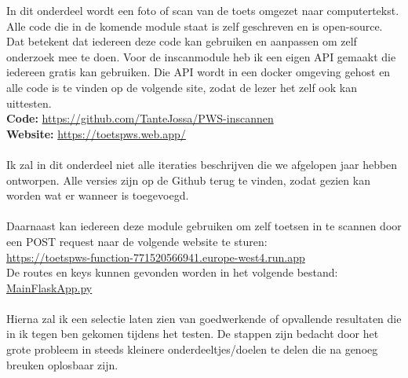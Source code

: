 \documentclass[12pt]{article}
\begin{document}
\begin{multicols}{2}
In dit onderdeel wordt een foto of scan van de toets omgezet naar computertekst. Alle code die in de komende module staat is zelf geschreven en is open-source. Dat betekent dat iedereen deze code kan gebruiken en aanpassen om zelf onderzoek mee te doen. Voor de inscanmodule heb ik een eigen API gemaakt die iedereen gratis kan gebruiken. Die API wordt in een docker omgeving gehost en alle code is te vinden op de volgende site, zodat de lezer het zelf ook kan uittesten. \\
\textbf{Code: }\url{https://github.com/TanteJossa/PWS-inscannen}\\
\textbf{Website: }\url{https://toetspws.web.app/}
\\\\
Ik zal in dit onderdeel niet alle iteraties beschrijven die we afgelopen jaar hebben ontworpen. Alle versies zijn op de Github terug te vinden, zodat gezien kan worden wat er wanneer is toegevoegd. 
\\\\
Daarnaast kan iedereen deze module gebruiken om zelf toetsen in te scannen door een POST request naar de volgende website te sturen: \\
\url{https://toetspws-function-771520566941.europe-west4.run.app}\\
De routes en keys kunnen gevonden worden in het volgende bestand: \\
\href{https://github.com/TanteJossa/PWS-inscannen/blob/main/section_scanner/app/main.py}{MainFlaskApp.py}
\\\\
Hierna zal ik een selectie laten zien van goedwerkende of opvallende resultaten die in ik tegen ben gekomen tijdens het testen. De stappen zijn bedacht door het grote probleem in steeds kleinere onderdeeltjes/doelen te delen die na genoeg breuken oplosbaar zijn. 
\end{multicols}
\pagebreak
\end{document}
